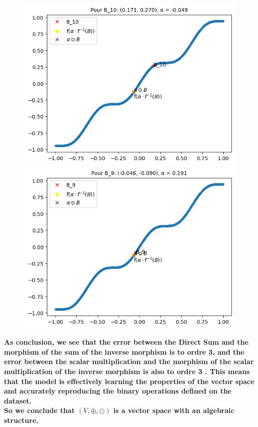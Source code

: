 \documentclass{article}
\begin{document}
            \begin{figure}[h]
                \centering
                \begin{minipage}{0.5\textwidth}
                    \centering
                    \includegraphics[width=0.9\linewidth]{./images/alpha3.png}
                \end{minipage}%
                \begin{minipage}{0.5\textwidth}
                    \centering
                    \includegraphics[width=0.9\linewidth]{./images/alpha4.png}
                \end{minipage}
            \end{figure}

        \textbf{As conclusion, we see that the error between the Direct Sum and the morphism of the sum of the inverse morphism is to ordre 3, and the error between the scalar multiplication and the morphism of the scalar multiplication of the inverse morphism is also to ordre 3 . This means that the model is effectively learning the properties of the vector space and accurately reproducing the binary operations defined on the dataset.\\
        So we conclude that $(V,\oplus,\odot)$ is a vector space with an algebraic structure.}
\end{document}
